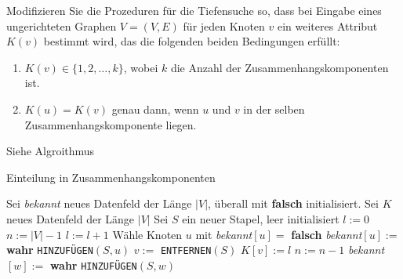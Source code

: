 
\begin{exercise}

\phantom{}

	Modifizieren Sie die Prozeduren für die Tiefensuche so, dass bei Eingabe eines ungerichteten Graphen $V = (V, E)$ für jeden Knoten $v$ ein weiteres Attribut $K(v)$ bestimmt wird, das die folgenden beiden Bedingungen erfüllt:
	\begin{enumerate}[label = (\alph*)]
		\item $K(v) \in \{1,2,\dots,k\}$, wobei $k$ die Anzahl der Zusammenhangskomponenten ist.
		
		\item $K(u) = K(v)$ genau dann, wenn $u$ und $v$ in der selben Zusammenhangskomponente liegen. 
	\end{enumerate}
	

\end{exercise}


\begin{solution}

\phantom{}
Siehe Algroithmus

	\begin{algorithm}
		\caption{Einteilung in Zusammenhangskomponenten} 
		\begin{algorithmic}[1]
			\State Sei \textit{bekannt} neues Datenfeld der Länge $|V|$, überall mit \textbf{falsch} initialisiert.
			\State Sei $K$ neues Datenfeld der Länge $|V|$
			\State Sei $S$ ein neuer Stapel, leer initialisiert
			\State $l := 0$
			\State $n := |V| - 1$
			\State $l := l + 1$
			\State Wähle Knoten $u$ mit \textit{bekannt}$[u] =$ \textbf{falsch}
			\State \textit{bekannt}$[u] :=$ \textbf{wahr}
			\State \verb|HINZUFÜGEN|$(S,u)$ 
			\State $v :=$ \verb|ENTFERNEN|$(S)$
			\State $K[v] := l$
			\State $n := n - 1$
			\State  \textit{bekannt}$[w] :=$ \textbf{wahr}
			\State \verb|HINZUFÜGEN|$(S,w)$
			\EndIf
			\EndFor
			\EndWhile
			\EndWhile
			\EndProcedure
		\end{algorithmic}
	\end{algorithm}

\end{solution}

